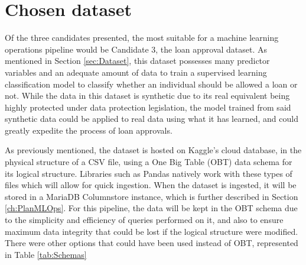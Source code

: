 \section{Chosen dataset}
Of the three candidates presented, the most suitable for a machine learning operations pipeline would be Candidate 3, the loan approval dataset. As mentioned 
in Section \ref{sec:Dataset}, this dataset possesses many predictor variables and an adequate amount of data to train a supervised learning classification model 
to classify whether an individual should be allowed a loan or not. While the data in this dataset is synthetic due to its real equivalent being highly protected 
under data protection legislation, the model trained from said synthetic data could be applied to real data using what it has learned, and could greatly expedite 
the process of loan approvals.

As previously mentioned, the dataset is hosted on Kaggle's cloud database, in the physical structure of a  
CSV file, using a One Big Table (OBT) data schema for its logical structure.  
Libraries such as Pandas natively work with these types of files which will allow for quick ingestion. 
When the dataset is ingested, it will be stored in a MariaDB Columnstore instance, which is further 
described in Section \ref{ch:PlanMLOps}. For this pipeline, the data will be kept in the OBT schema
due to the simplicity and efficiency of queries performed on it, and also to ensure maximum data integrity
that could be lost if the logical structure were modified. There were other options that could have been used
instead of OBT, represented in Table \ref{tab:Schemas}


